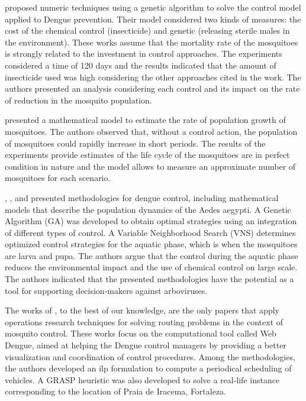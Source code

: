 \documentclass[a4paper,11pt]{article}
\begin{document}
\cite{bannwart-sbpo:2013,bannwart:2013}  proposed  numeric  techniques  using  a
genetic algorithm to solve the control model applied to Dengue prevention. Their
model  considered two  kinds  of  measures: the  cost  of  the chemical  control
(insecticide) and  genetic (releasing sterile  males in the  environment). These
works assume  that the mortality rate  of the mosquitoes is  strongly related to
the investment in  control approaches. The experiments considered a  time of 120
days and  the results  indicated that  the amount of  insecticide used  was high
considering the  other approaches cited  in the  work. The authors  presented an
analysis considering each control and its impact on the rate of reduction in the
mosquito population.

\cite{cantane:2015}  presented a  mathematical  model to  estimate  the rate  of
population growth  of mosquitoes. The  authors observed that, without  a control
action, the  population of mosquitoes  could rapidly increase in  short periods.
The  results of  the experiments  provide  estimates of  the life  cycle of  the
mosquitoes are in perfect condition in nature and the model allows to measure an
approximate number of mosquitoes for each scenario.

\cite{dosreis:2018},   \cite{florentino:2018},    and   \cite{florentino-b:2018}
presented methodologies  for dengue control, including  mathematical models that
describe the population dynamics of the  Aedes aegypti. A Genetic Algorithm (GA)
was developed  to obtain  optimal strategies using  an integration  of different
types  of control.  A Variable  Neighborhood Search  (VNS) determines  optimized
control strategies for the aquatic phase, which is when the mosquitoes are larva
and pupa.  The authors argue that  the control during the  aquatic phase reduces
the environmental  impact and the  use of chemical  control on large  scale. The
authors indicated that the presented methodologies  have the potential as a tool
for supporting decision-makers against arboviruses.

The works of \cite{negreiros:2008,negreiros:2011,negreiros-2020}, to the best of
our knowledge, are the only papers that apply operations research techniques for
solving routing problems  in the context of mosquito control.  These works focus
on the computational tool called Web Dengue, aimed at helping the Dengue control
managers  by  providing  a  better visualization  and  coordination  of  control
procedures.  Among  the  methodologies,   the  authors  developed  an  \gls{ilp}
formulation to  compute a periodical  scheduling of vehicles. A  GRASP heuristic
was also developed  to solve a real-life instance corresponding  to the location
of Praia de Iracema, Fortaleza.
\newline
\end{document}

